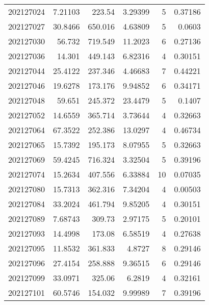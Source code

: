 \begin{tabular}{rrrrrr}
 202127024 &          7.21103 &      223.54   &            3.29399 &           5 & 0.37186 \\
 202127027 &         30.8466  &      650.016  &            4.63809 &           5 & 0.0603  \\
 202127030 &         56.732   &      719.549  &           11.2023  &           6 & 0.27136 \\
 202127036 &         14.301   &      449.143  &            6.82316 &           4 & 0.30151 \\
 202127044 &         25.4122  &      237.346  &            4.46683 &           7 & 0.44221 \\
 202127046 &         19.6278  &      173.176  &            9.94852 &           6 & 0.34171 \\
 202127048 &         59.651   &      245.372  &           23.4479  &           5 & 0.1407  \\
 202127052 &         14.6559  &      365.714  &            3.73644 &           4 & 0.32663 \\
 202127064 &         67.3522  &      252.386  &           13.0297  &           4 & 0.46734 \\
 202127065 &         15.7392  &      195.173  &            8.07955 &           5 & 0.32663 \\
 202127069 &         59.4245  &      716.324  &            3.32504 &           5 & 0.39196 \\
 202127074 &         15.2634  &      407.556  &            6.33884 &          10 & 0.07035 \\
 202127080 &         15.7313  &      362.316  &            7.34204 &           4 & 0.00503 \\
 202127084 &         33.2024  &      461.794  &            9.85205 &           4 & 0.30151 \\
 202127089 &          7.68743 &      309.73   &            2.97175 &           5 & 0.20101 \\
 202127093 &         14.4998  &      173.08   &            6.58519 &           4 & 0.27638 \\
 202127095 &         11.8532  &      361.833  &            4.8727  &           8 & 0.29146 \\
 202127096 &         27.4154  &      258.888  &            9.36515 &           6 & 0.29146 \\
 202127099 &         33.0971  &      325.06   &            6.2819  &           4 & 0.32161 \\
 202127101 &         60.5746  &      154.032  &            9.99989 &           7 & 0.39196 \\

\end{tabular}
